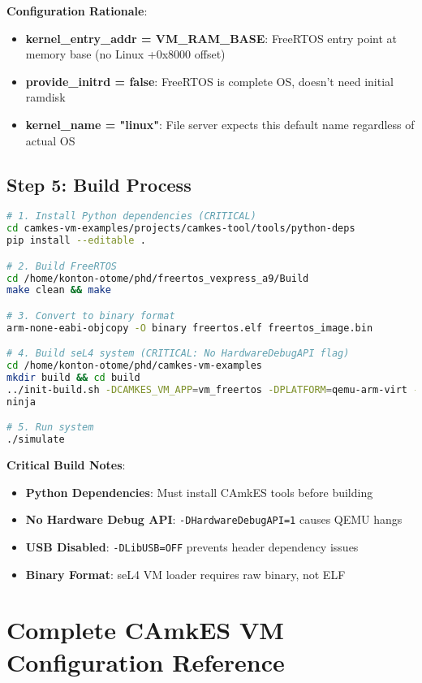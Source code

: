 \documentclass[12pt]{article}
\begin{document}
\textbf{Configuration Rationale}:
\begin{itemize}
\item \textbf{kernel\_entry\_addr = VM\_RAM\_BASE}: FreeRTOS entry point at memory base (no Linux +0x8000 offset)
\item \textbf{provide\_initrd = false}: FreeRTOS is complete OS, doesn't need initial ramdisk
\item \textbf{kernel\_name = "linux"}: File server expects this default name regardless of actual OS
\end{itemize}

\subsection{Step 5: Build Process}

\begin{lstlisting}[language=bash, caption=Complete Build Process]
# 1. Install Python dependencies (CRITICAL)
cd camkes-vm-examples/projects/camkes-tool/tools/python-deps
pip install --editable .

# 2. Build FreeRTOS  
cd /home/konton-otome/phd/freertos_vexpress_a9/Build
make clean && make

# 3. Convert to binary format
arm-none-eabi-objcopy -O binary freertos.elf freertos_image.bin

# 4. Build seL4 system (CRITICAL: No HardwareDebugAPI flag)
cd /home/konton-otome/phd/camkes-vm-examples
mkdir build && cd build
../init-build.sh -DCAMKES_VM_APP=vm_freertos -DPLATFORM=qemu-arm-virt -DSIMULATION=1 -DLibUSB=OFF
ninja

# 5. Run system
./simulate
\end{lstlisting}

\textbf{Critical Build Notes}:
\begin{itemize}
\item \textbf{Python Dependencies}: Must install CAmkES tools before building
\item \textbf{No Hardware Debug API}: \texttt{-DHardwareDebugAPI=1} causes QEMU hangs
\item \textbf{USB Disabled}: \texttt{-DLibUSB=OFF} prevents header dependency issues
\item \textbf{Binary Format}: seL4 VM loader requires raw binary, not ELF
\end{itemize}

\section{Complete CAmkES VM Configuration Reference}
\end{document}
